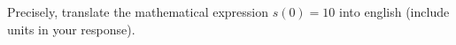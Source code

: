 {Precisely, translate the mathematical expression $s(0)=10$ into english (include units in your response).}
{}